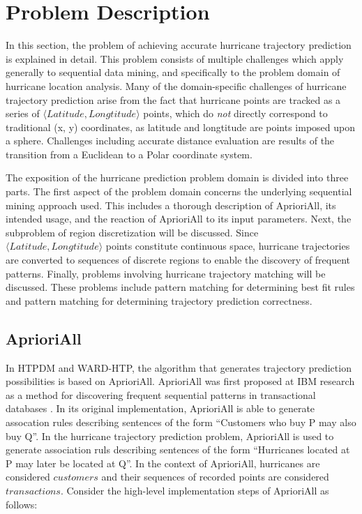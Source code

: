 \documentclass[12pt,conference]{IEEEtran}
\begin{document}
\section{Problem Description}


In this section, the problem of achieving accurate hurricane trajectory prediction is explained in detail. This problem consists of multiple challenges which apply generally to sequential data mining, and specifically to the problem domain of hurricane location analysis. Many of the domain-specific challenges of hurricane trajectory prediction arise from the fact that hurricane points are tracked as a series of $\langle Latitude, Longtitude \rangle$ points, which do \textit{not} directly correspond to traditional (x, y) coordinates, as latitude and longtitude are points imposed upon a sphere. Challenges including accurate distance evaluation are results of the transition from a Euclidean to a Polar coordinate system.

The exposition of the hurricane prediction problem domain is divided into three parts. The first aspect of the problem domain concerns the underlying sequential mining approach used. This includes a thorough description of AprioriAll, its intended usage, and the reaction of AprioriAll to its input parameters. Next, the subproblem of region discretization will be discussed. Since $\langle Latitude, Longtitude \rangle$ points constitute continuous space, hurricane trajectories are converted to sequences of discrete regions to enable the discovery of frequent patterns. Finally, problems involving hurricane trajectory matching will be discussed. These problems include pattern matching for determining best fit rules and pattern matching for determining trajectory prediction correctness.

\subsection{AprioriAll}

In HTPDM and WARD-HTP, the algorithm that generates trajectory prediction possibilities is based on AprioriAll. AprioriAll was first proposed at IBM research as a method for discovering frequent sequential patterns in transactional databases \cite{AprioriAll-original}. In its original implementation, AprioriAll is able to generate assocation rules describing sentences of the form ``Customers who buy P may also buy Q''. In the hurricane trajectory prediction problem, AprioriAll is used to generate association ruls describing sentences of the form ``Hurricanes located at P may later be located at Q''. In the context of AprioriAll, hurricanes are considered $customers$ and their sequences of recorded points are considered $transactions$. Consider the high-level implementation steps of AprioriAll as follows:
\end{document}

